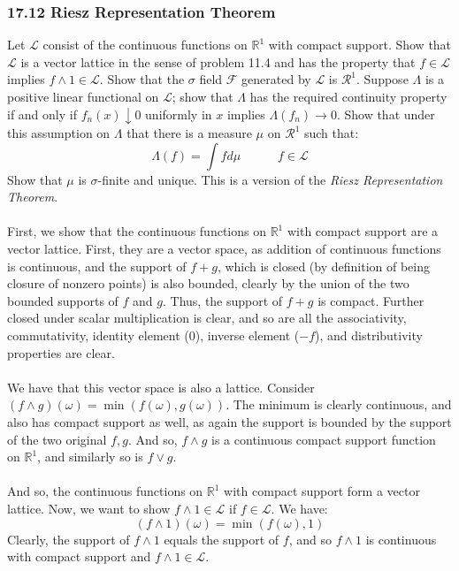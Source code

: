 \documentclass[12pt,a4paper]{article}
\newcommand{\1}[1]{\mathbbm{1}\left\{ #1 \right\}}
\newcommand{\R}{\mathbb{R}}
\newcommand{\lcal}{\mathcal{L}}
\newcommand{\fcal}{\mathcal{F}}
\newcommand{\rcal}{\mathcal{R}}
\begin{document}
\subsubsection{17.12 Riesz Representation Theorem} Let $\lcal$ consist of the continuous functions on $\R^1$ with compact support. Show that $\lcal$ is a vector lattice in the sense of problem 11.4 and has the property that $f \in \lcal$ implies $f \wedge 1 \in \lcal$. Show that the $\sigma$ field $\fcal$ generated by $\lcal$ is $\rcal^1$. Suppose $\Lambda$ is a positive linear functional on $\lcal$; show that $\Lambda$ has the required continuity property if and only if $f_n(x) \downarrow 0$ uniformly in $x$ implies $\Lambda(f_n) \to 0$. Show that under this assumption on $\Lambda$ that there is a measure $\mu$ on $\rcal^1$ such that:
$$
	\Lambda(f) = \int f d\mu \quad\quad\quad f \in \lcal
$$
Show that $\mu$ is $\sigma$-finite and unique. This is a version of the \textit{Riesz Representation Theorem}.
\\\\
First, we show that the continuous functions on $\R^1$ with compact support are a vector lattice. First, they are a vector space, as addition of continuous functions is continuous, and the support of $f + g$, which is closed (by definition of being closure of nonzero points) is also bounded, clearly by the union of the two bounded supports of $f$ and $g$. Thus, the support of $f + g$ is compact. Further closed under scalar multiplication is clear, and so are all the associativity, commutativity, identity element (0), inverse element ($-f$), and distributivity properties are clear.
\\\\
We have that this vector space is also a lattice. Consider $(f \wedge g)(\omega) = \min(f(\omega), g(\omega))$. The minimum is clearly continuous, and also has compact support as well, as again the support is bounded by the support of the two original $f,g$. And so, $f \wedge g$ is a continuous compact support function on $\R^1$, and similarly so is $f \vee g$.
\\\\
And so, the continuous functions on $\R^1$ with compact support form a vector lattice. Now, we want to show $f \wedge 1 \in \lcal$ if $f \in \lcal$. We have:
$$
	(f \wedge 1)(\omega) = \min(f(\omega), 1)
$$
Clearly, the support of $f \wedge 1$ equals the support of $f$, and so $f \wedge 1$ is continuous with compact support and $f \wedge 1 \in \lcal$.
\\\\
\end{document}
